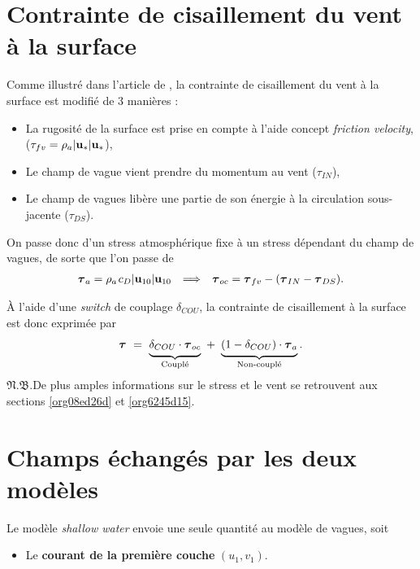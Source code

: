\documentclass[10pt]{report}
\numberwithin{equation}{section}
\newcommand{\uu}{\vb{u}}
\newcommand{\tall}{\vphantom{A^{x^x}_p}}
\newcommand{\pt}{\hspace{1pt}} %
\newcommand{\nb}{\underline{{\footnotesize\EightStarConvex}\pt $\mathfrak{N.B.}$\vphantom{p}}\hspace{3pt}}
\begin{document}
\section{Contrainte de cisaillement du vent à la surface}
\label{sec:orga63cf67}
\label{org855623e}

Comme illustré dans l'article de \Textcite{breivik_al_2015}, la contrainte de cisaillement du vent à la surface est modifié de 3 manières :
\begin{itemize}
\item La rugosité de la surface est prise en compte à l'aide concept \emph{friction velocity}, (\(\tau_{fv} = \rho_a |\uu_*| \uu_*\)),
\item Le champ de vague vient prendre du momentum au vent (\(\tau_{IN}\)),
\item Le champ de vagues libère une partie de son énergie à la circulation sous-jacente (\(\tau_{DS}\)).
\end{itemize}

On passe donc d'un stress atmosphérique fixe à un stress dépendant du champ de vagues, de sorte que l'on passe de 
\begin{align}
   && \boldsymbol{\tau}_a = \rho_a\pt c_D \abs{\uu_{10}}\uu_{10} && \Longrightarrow && \boldsymbol{\tau}_{oc} = \boldsymbol{\tau}_{fv} - (\boldsymbol{\tau}_{IN} - \boldsymbol{\tau}_{DS}). &&
\end{align}

À l'aide d'une \emph{switch} de couplage \(\delta_{COU}\), la contrainte de cisaillement à la surface est donc exprimée par
\begin{equation}
   \boldsymbol{\tau}\ =\ \underbrace{\tall\delta_{COU}\cdot\boldsymbol{\tau}_{oc}}_\text{Couplé}\ + \ \underbrace{(1-\delta_{COU}) \cdot \boldsymbol{\tau}_a\tall}_\text{Non-couplé}.
\end{equation}
\nb De plus amples informations sur le stress et le vent se retrouvent aux sections \ref{org08ed26d} et \ref{org6245d15}.

\section{Champs échangés par les deux modèles}
\label{sec:org841f30f}

Le modèle \emph{shallow water} envoie une seule quantité au modèle de vagues, soit
\begin{itemize}
\item Le \textbf{courant de la première couche} \((u_1,v_1)\).\bigskip
\end{itemize}
\end{document}
